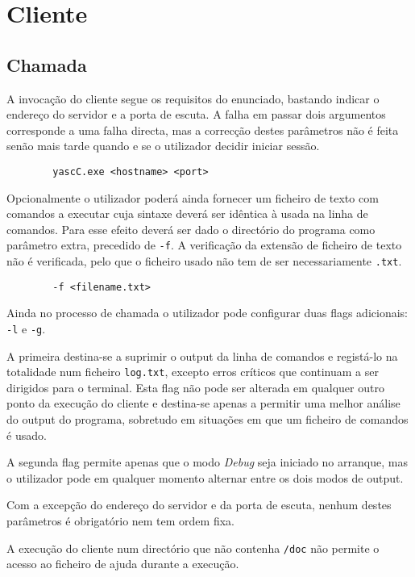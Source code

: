 \section{Cliente\label{sec:Cliente}}

\subsection{Chamada\label{sec:cliente_chamada}}

	\indent\indent A invocação do cliente segue os requisitos do enunciado, bastando indicar o endereço do servidor e a porta de escuta.
	A falha em passar dois argumentos corresponde a uma falha directa, mas a correcção destes parâmetros não é feita senão mais tarde quando e se o utilizador decidir iniciar sessão.
	\begin{verbatim}
		yascC.exe <hostname> <port>
	\end{verbatim}
	
	Opcionalmente o utilizador poderá ainda fornecer um ficheiro de texto com comandos a executar cuja sintaxe deverá ser idêntica à usada na linha de comandos.
	Para esse efeito deverá ser dado o directório do programa como parâmetro extra, precedido de \verb|-f|.
	A verificação da extensão de ficheiro de texto não é verificada, pelo que o ficheiro usado não tem de ser necessariamente \verb|.txt|.
	\begin{verbatim}
		-f <filename.txt>
	\end{verbatim}

	Ainda no processo de chamada o utilizador pode configurar duas flags adicionais: \verb|-l| e \verb|-g|.
	
	A primeira destina-se a suprimir o output da linha de comandos e registá-lo na totalidade num ficheiro \verb|log.txt|, excepto erros críticos que continuam a ser dirigidos para o terminal.
	Esta flag não pode ser alterada em qualquer outro ponto da execução do cliente e destina-se apenas a permitir uma melhor análise do output do programa, sobretudo em situações em que um ficheiro de comandos é usado.
	
	A segunda flag permite apenas que o modo \emph{Debug} seja iniciado no arranque, mas o utilizador pode em qualquer momento alternar entre os dois modos de output.
	
	Com a excepção do endereço do servidor e da porta de escuta, nenhum destes parâmetros é obrigatório nem tem ordem fixa.
	
	A execução do cliente num directório que não contenha \verb|/doc| não permite o acesso ao ficheiro de ajuda durante a execução.



